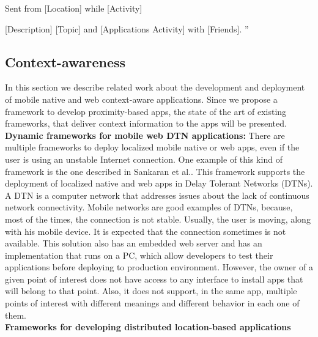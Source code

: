 Sent from [Location] while [Activity]

[Description] [Topic] and [Applications Activity] with 
[Friends].
''
\\
\subsection{Context-awareness}
\label{sub:frameworks_context_aware}
In this section we describe related work about the
development and deployment of mobile native and web 
context-aware applications.
Since we propose a framework to develop
proximity-based apps, the state
of the art of existing frameworks, that deliver
context information to the apps will be presented.
\\
\textbf{Dynamic frameworks for 
mobile web DTN applications:}
There are multiple frameworks to deploy localized
mobile native or web apps, even if the user is using an
unstable Internet connection. One example of this
kind of framework is the one
described in Sankaran et al.\cite{Sankaran2014}.
This framework supports the deployment of localized 
native and
web apps in Delay Tolerant Networks (DTNs).
A DTN is a computer network that 
addresses issues about the lack of continuous network
connectivity. 
Mobile networks are good examples of DTNs,
because, most of the times, the connection is not stable.
Usually, the user is moving, along with his mobile 
device.
It is expected that the connection sometimes is not
available.  
This solution also has an embedded web server 
and has an implementation that runs on a PC, which allow
developers to test their applications before deploying
to production environment.
However, the owner of a given point of interest does not
have access to any interface to install apps that will
belong to that point. Also, it does not support, in the
same app, multiple points of interest with different
meanings and different behavior in each one of them.
\\
\textbf{Frameworks for developing distributed
location-based applications}
